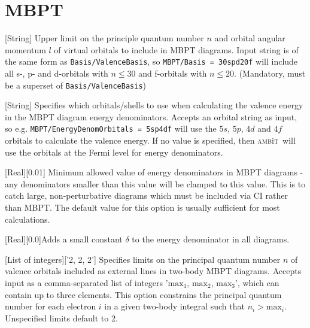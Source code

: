 \documentclass{report}
\newcommand{\ambit}{\textsc{amb}{\footnotesize i}\textsc{t}}
\begin{document}
\section{MBPT}

[String]{%
Upper limit on the principle quantum number $n$ and orbital angular momentum $l$ of
virtual orbitals to include in MBPT diagrams. Input string is of the same form as
\texttt{Basis/ValenceBasis}, so \texttt{MBPT/Basis = 30spd20f} will include all s-, p- and d-orbitals
with $n \leq 30$ and f-orbitals with $n \leq 20$. (Mandatory, must be a superset of
\texttt{Basis/ValenceBasis})%
}

[String]{%
Specifies which orbitals/shells to use when calculating the valence energy
in the MBPT diagram energy denominators. Accepts an orbital string as input, so e.g.
\texttt{MBPT/EnergyDenomOrbitals = 5sp4df} will use the $5s$, $5p$, $4d$ and $4f$ orbitals to calculate
the valence energy. If no value is specified, then \ambit\ will use the orbitals at the Fermi level for
energy denominators.%
}






[Real][0.01]{%
Minimum allowed value of energy denominators in MBPT diagrams - any denominators smaller than this value
will be clamped to this value. This is to catch large, non-perturbative diagrams which must be
included via CI rather than MBPT. The default value for this option is usually sufficient for most
calculations.%
}

[Real][0.0]{Adds a small constant $\delta$ to the energy denominator in all diagrams.}

[List of integers]['2, 2, 2']{%
Specifies limits on the principal quantum number $n$ of
valence orbitals included as external lines in two-body MBPT diagrams. Accepts input as a
comma-separated list of integers '$\mathrm{max}_1$, $\mathrm{max}_2$, $\mathrm{max}_3$', which can
contain up to three elements. This option constrains the principal quantum number for each electron $i$
in a given two-body integral such that $n_i > \mathrm{max}_i$. Unspecified limits default to 2.%
}
\end{document}
